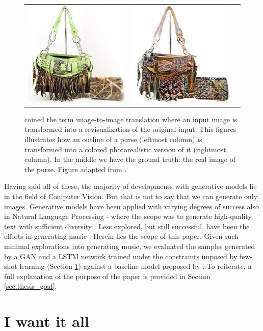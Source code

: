 \documentclass[a4paper]{book}
\begin{document}
\begin{figure}[t]
\begin{tabular}{ccc}
    \includegraphics[width=.15\linewidth]{images/handbags_edges_lotsofresults_latex/gt_130_AB.jpg} &
    \includegraphics[width=.15\linewidth]{images/handbags_edges_lotsofresults_latex/L1cGAN_130_AB.jpg} \\
    \end{tabular}
    \caption{\textcite{isola_image--image_2016} coined the term image-to-image translation where an input image is transformed into a revisualization of the original input. This figures illustrates how an outline of a purse (leftmost column) is transformed into a colored photorealistic version of it (rightmost column). In the middle we have the ground truth: the real image of the purse. Figure adapted from \textcite{isola_image--image_2016}.}
    \label{fig:pix2pix}
\end{figure}

Having said all of these, the majority of developments with generative models lie in the field of Computer Vision. But that is not to say that we can generate only images. Generative models have been applied with varying degrees of success also in Natural Language Processing - where the scope was to generate high-quality text with sufficient diversity \parencite[e.g.,][]{yu_seqgan_2016, chen_adversarial_2018}. Less explored, but still successful, have been the efforts in generating music \parencite[e.g.,][]{mogren_c-rnn-gan_2016, dong_musegan_2017}. Herein lies the scope of this paper. Given such minimal explorations into generating music, we evaluated the samples generated by a GAN \parencite{mogren_c-rnn-gan_2016} and a LSTM network \parencite{oore_this_2018} trained under the constraints imposed by few-shot learning (Section \ref{sec:hungry}) against a baseline model proposed by \textcite{larochelle_few-shot_2017}. To reiterate, a full explanation of the purpose of the paper is provided in Section \ref{sec:thesis_goal}.

\section{I want it all}\label{sec:hungry}
\end{document}
